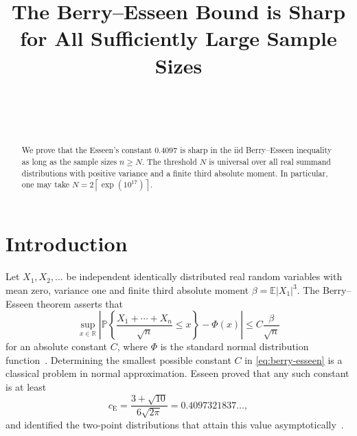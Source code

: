 \documentclass[aop]{imsart}
\theoremstyle{plain}
\theoremstyle{definition}
\theoremstyle{definition}
\newcommand{\PP}{\mathbb P}
\newcommand{\EE}{\mathbb E}
\newcommand{\R}{\mathbb R}
\newcommand{\ce}{c_{\mathrm E}}
\begin{document}
\begin{frontmatter}
\title{The Berry--Esseen Bound is Sharp for All Sufficiently Large Sample Sizes}

\begin{aug}
\author[A]{~
  }
\author[A]{~
  }
\address[A]{Department of Statistics and Data Science,
  University of California, Los Angeles
  }
\end{aug}



\begin{abstract}
We prove that the Esseen's constant $0.4097$ is sharp in the iid Berry--Esseen inequality as long as the sample sizes $n\ge N$. The threshold $N$ is universal over all real summand distributions with positive variance and a finite third absolute moment. In particular, one may take $N=2\left\lceil\exp(10^{17})\right\rceil.
$
\end{abstract}

\begin{keyword}[class=MSC2020]
\end{keyword}

\begin{keyword}
\end{keyword}

\end{frontmatter}

\section{Introduction}\label{sec:introduction}

Let \(X_1,X_2,\ldots\) be independent identically distributed real random variables with mean zero, variance one and finite third absolute moment \(\beta=\EE|X_1|^3\). The Berry--Esseen theorem asserts that
\begin{equation}\label{eq:berry-esseen}
 \sup_{x\in\R}\left|
 \PP\left\{\frac{X_1+\cdots+X_n}{\sqrt n}\le x\right\}-\Phi(x)
 \right|\le C\frac{\beta}{\sqrt n}
\end{equation}
for an absolute constant \(C\), where \(\Phi\) is the standard normal distribution function~\cite{Berry1941,Esseen1942}. Determining the smallest possible constant $C$ in \eqref{eq:berry-esseen} is a classical problem in normal approximation. Esseen proved that any such constant is at least
\begin{equation}\label{eq:ce}
 \ce=\frac{3+\sqrt{10}}{6\sqrt{2\pi}}=0.4097321837\ldots,
\end{equation}
and identified the two-point distributions that attain this value asymptotically~\cite{Esseen1956}. 
\end{document}
